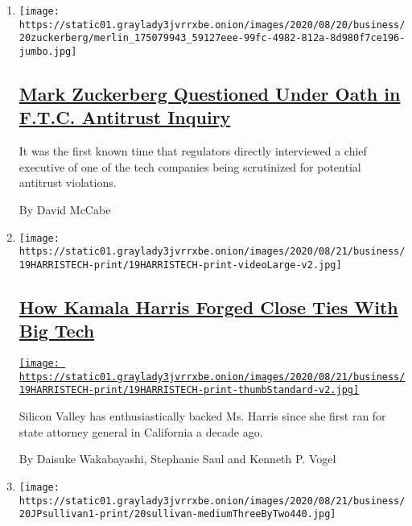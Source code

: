 \begin{enumerate}
\def\labelenumi{\arabic{enumi}.}
\item
  \texttt{[image: https://static01.graylady3jvrrxbe.onion/images/2020/08/20/business/20zuckerberg/merlin\_175079943\_59127eee-99fc-4982-812a-8d980f7ce196-jumbo.jpg]}

  \hypertarget{mark-zuckerberg-questioned-under-oath-in-ftc-antitrust-inquiry}{%
  \subsection{\texorpdfstring{\href{/2020/08/20/technology/facebook-zuckerberg-ftc-questioned.html}{Mark
  Zuckerberg Questioned Under Oath in F.T.C. Antitrust
  Inquiry}}{Mark Zuckerberg Questioned Under Oath in F.T.C. Antitrust Inquiry}}\label{mark-zuckerberg-questioned-under-oath-in-ftc-antitrust-inquiry}}

  It was the first known time that regulators directly interviewed a
  chief executive of one of the tech companies being scrutinized for
  potential antitrust violations.

  By David McCabe
\item
  \texttt{[image: https://static01.graylady3jvrrxbe.onion/images/2020/08/21/business/19HARRISTECH-print/19HARRISTECH-print-videoLarge-v2.jpg]}

  \hypertarget{how-kamala-harris-forged-close-ties-with-big-tech}{%
  \subsection{\texorpdfstring{\href{/2020/08/20/technology/kamala-harris-ties-to-big-tech.html}{How
  Kamala Harris Forged Close Ties With Big
  Tech}}{How Kamala Harris Forged Close Ties With Big Tech}}\label{how-kamala-harris-forged-close-ties-with-big-tech}}

  \href{/2020/08/20/technology/kamala-harris-ties-to-big-tech.html}{\texttt{[image: https://static01.graylady3jvrrxbe.onion/images/2020/08/21/business/19HARRISTECH-print/19HARRISTECH-print-thumbStandard-v2.jpg]}}

  Silicon Valley has enthusiastically backed Ms. Harris since she first
  ran for state attorney general in California a decade ago.

  By Daisuke Wakabayashi, Stephanie Saul and Kenneth P. Vogel
\item
  \texttt{[image: https://static01.graylady3jvrrxbe.onion/images/2020/08/21/business/20JPsullivan1-print/20sullivan-mediumThreeByTwo440.jpg]}


\end{enumerate}
